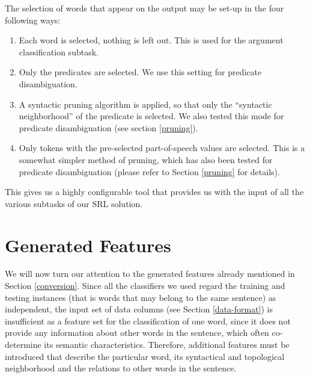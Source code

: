 \documentclass[12pt,notitlepage]{report}
\begin{document}
The selection of words that appear on the output may be set-up in the four following ways:
\begin{enumerate}
    \item Each word is selected, nothing is left out. This is used for the argument classification subtask.
    \item Only the predicates are selected. We use this setting for predicate disambiguation.
    \item A syntactic pruning algorithm \citep{asahara09,zhao09} is applied, so that only the ``syntactic neighborhood'' of the predicate is selected. We also tested this mode for predicate disambiguation (see section \ref{pruning}).
    \item Only tokens with the pre-selected part-of-speech values are selected. This is a somewhat simpler method of pruning, which has also been tested for predicate disambiguation (please refer to Section \ref{pruning} for details).
\end{enumerate}

This gives us a highly configurable tool that provides us with the input of all the various subtasks of our SRL solution.

\section{Generated Features}\label{features}

We will now turn our attention to the generated features already mentioned in Section \ref{conversion}. Since all the classifiers we used regard the training and testing instances (that is words that may belong to the same sentence) as independent, the input set of data columns (see Section \ref{data-format}) is insufficient as a feature set for the classification of one word, since it does not provide any information about other words in the sentence, which often co-determine its semantic characteristics. Therefore, additional features must be introduced that describe the particular word, its syntactical and topological neighborhood and the relations to other words in the sentence.
\end{document}
